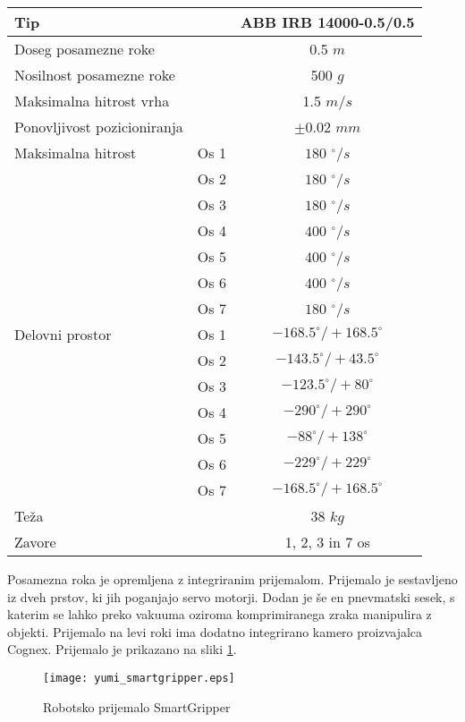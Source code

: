 \begin{center}
\begin{tabular}{|lr|c|}
\hline   Tip &  & ABB IRB 14000-0.5/0.5 \\
\hline Doseg posamezne roke & & 0.5 $m$ \\
\hline Nosilnost posamezne roke & & 500 $g$ \\
\hline Maksimalna hitrost vrha & & 1.5 $m/s$ \\
\hline Ponovljivost pozicioniranja& & $\pm 0.02 $ $mm$ \\
\hline Maksimalna hitrost
     & Os 1 & $180$ $^\circ/s$ \\
     & Os 2 & $180$ $^\circ/s$ \\
     & Os 3 & $180$ $^\circ/s$ \\
     & Os 4 & $400$ $^\circ/s$ \\
     & Os 5 & $400$ $^\circ/s$ \\
     & Os 6 & $400$ $^\circ/s$ \\
     & Os 7 & $180$ $^\circ/s$ \\
\hline Delovni prostor
     & Os 1 & $-168.5^\circ/+168.5^\circ$\\
     & Os 2 & $-143.5^\circ/+43.5^\circ$\\
     & Os 3 & $-123.5^\circ/+80^\circ$\\
     & Os 4 & $-290^\circ/+290^\circ$\\
     & Os 5 & $-88^\circ/+138^\circ$\\
     & Os 6 & $-229^\circ/+229^\circ$\\
     & Os 7 & $-168.5^\circ/+168.5^\circ$\\
\hline   Teža &  & $38$ $kg$ \\
\hline   Zavore &  & 1, 2, 3 in 7 os \\
\hline
\end{tabular}
\end{center}


Posamezna roka je opremljena z integriranim prijemalom. Prijemalo je sestavljeno iz dveh prstov, ki jih poganjajo servo motorji. Dodan je še en pnevmatski sesek, s katerim se lahko preko vakuuma oziroma komprimiranega zraka manipulira z objekti. Prijemalo na levi roki ima dodatno integrirano kamero proizvajalca Cognex. Prijemalo je prikazano na sliki \ref{fig:yumi_smartgripper}.

\begin{figure}[!hbt]
\centering
\texttt{[image: yumi\_smartgripper.eps]}
\caption{Robotsko prijemalo SmartGripper}
\label{fig:yumi_smartgripper}
\end{figure}


